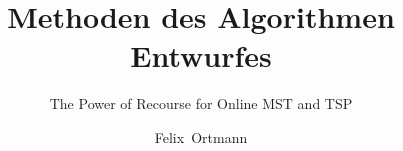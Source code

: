 \title[MDAE: Recourse -- Online MST and TSP]{Methoden des Algorithmen Entwurfes}
\subtitle{The Power of Recourse for Online MST and TSP}
\author{Felix~Ortmann}
\beamertemplatenavigationsymbolsempty